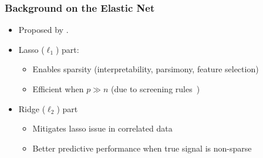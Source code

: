 \documentclass[aspectratio=1610,onlytextwidth]{beamer}
\begin{document}
\begin{frame}[c]
  \frametitle{Background on the Elastic Net}

  \begin{itemize}
    \item<1-> Proposed by \textcite{zou2005}.
    \item<2-> Lasso (\(\ell_1\)) part:
          \begin{itemize}
            \item Enables sparsity (interpretability, parsimony, feature selection)
            \item Efficient when \(p \gg n\) (due to screening rules~\parencite{elghaoui2010,tibshirani2012})
          \end{itemize}
    \item<3-> Ridge (\(\ell_2\)) part
          \begin{itemize}
            \item Mitigates lasso issue in correlated data
            \item Better predictive performance when true signal is non-sparse
          \end{itemize}
  \end{itemize}
\end{frame}
\end{document}
